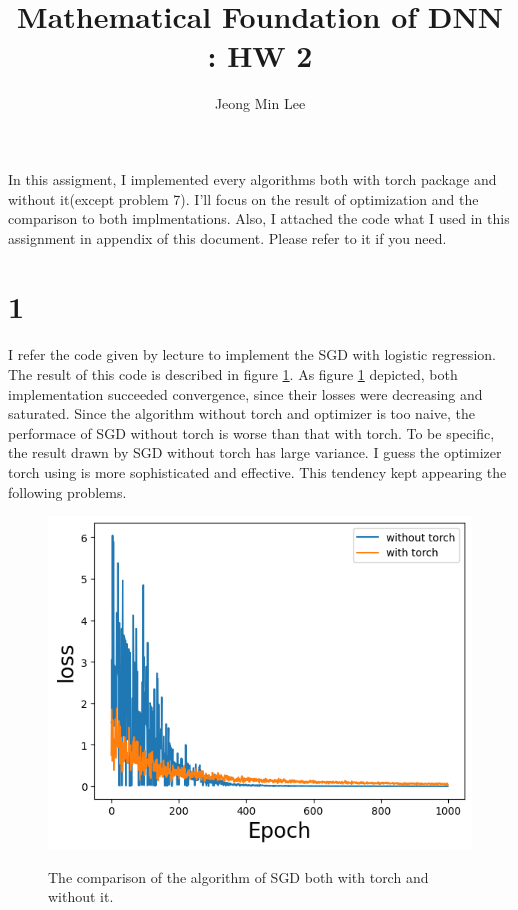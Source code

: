 \documentclass[10pt]{article}
\title{\textbf{Mathematical Foundation of DNN : HW 2}}
\author{Jeong Min Lee}
\begin{document}
\maketitle
In this assigment, I implemented every algorithms both with torch package and without it(except problem 7). 
I'll focus on the result of optimization and the comparison to both implmentations. Also, I attached the code what I used in this assignment in appendix of this document. Please refer to it if you need.
\section*{1}

I refer the code given by lecture to implement the SGD with logistic regression. The result of this code is 
described in figure \ref{fig1}. As figure \ref{fig1} depicted, both implementation succeeded convergence, since their losses were decreasing and saturated.
Since the algorithm without torch and optimizer is too naive, the performace of SGD without torch is worse than that with torch. To be specific, 
the result drawn by SGD without torch has large variance. I guess the optimizer torch using is more sophisticated and effective. This tendency kept appearing the following problems.

\begin{figure}[!h]
    \begin{center}
        \includegraphics[scale = 0.5]{../hw2/fig/prob1.png}
        \label{fig1}
    \end{center}
    \caption{The comparison of the algorithm of SGD both with torch and without it.}
\end{figure}
\end{document}
